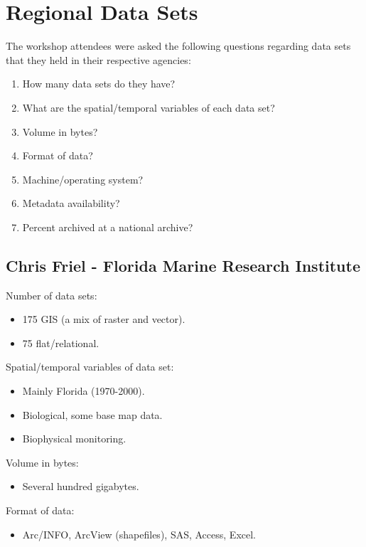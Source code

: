 \section{Regional Data Sets}

The workshop attendees were asked the following questions regarding data sets that they held in 
their respective agencies:

\begin{enumerate}
\item How many data sets do they have?
\item What are the spatial/temporal variables of each data set?
\item Volume in bytes?
\item Format of data?
\item Machine/operating system?
\item Metadata availability?
\item Percent archived at a national archive?
\end{enumerate}

\subsection{Chris Friel - Florida Marine Research Institute}
 
Number of data sets:
\begin{itemize}
  \item 175 GIS (a mix of raster and vector).
  \item 75 flat/relational.
\end{itemize}

Spatial/temporal variables of data set:
\begin{itemize}
  \item Mainly Florida (1970-2000).
  \item Biological, some base map data.
  \item Biophysical monitoring.
\end{itemize}

Volume in bytes:
\begin{itemize}
  \item Several hundred gigabytes.
\end{itemize}

Format of data:
\begin{itemize}
  \item Arc/INFO, ArcView (shapefiles), SAS, Access, Excel.
\end{itemize}

